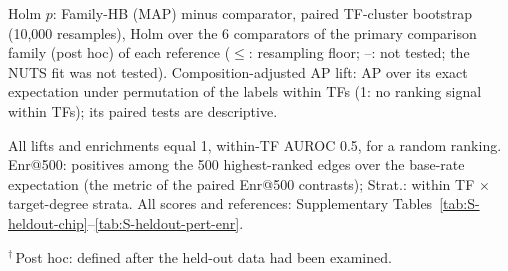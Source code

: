 \begin{table}[tbp]
{
}
\par\smallskip
\begin{minipage}{\linewidth}\footnotesize
Holm $p$: Family-HB (MAP) minus comparator, paired TF-cluster bootstrap (10{,}000 resamples), Holm over the 6 comparators of the primary comparison family (post hoc) of each reference ($\leq$: resampling floor; --: not tested; the NUTS fit was not tested). Composition-adjusted AP lift: AP over its exact expectation under permutation of the labels within TFs (1: no ranking signal within TFs); its paired tests are descriptive.

All lifts and enrichments equal 1, within-TF AUROC 0.5, for a random ranking. Enr@500: positives among the 500 highest-ranked edges over the base-rate expectation (the metric of the paired Enr@500 contrasts); Strat.: within TF $\times$ target-degree strata. All scores and references: Supplementary Tables~\ref{tab:S-heldout-chip}--\ref{tab:S-heldout-pert-enr}.

$^{\dagger}$\,Post hoc: defined after the held-out data had been examined.
\end{minipage}
\end{table}
